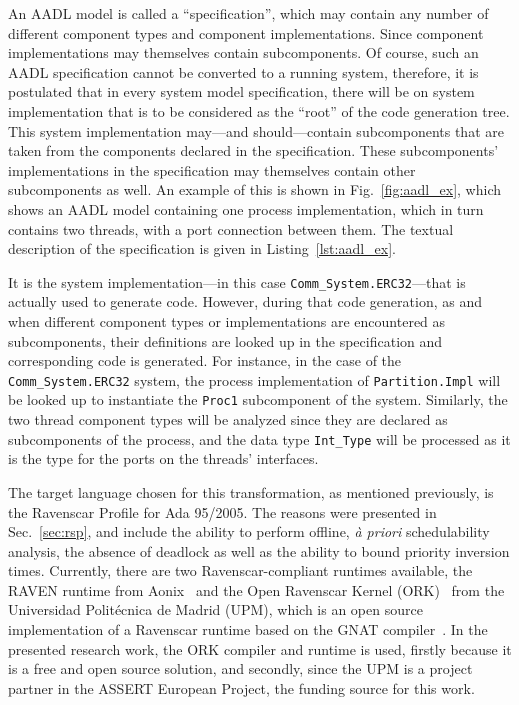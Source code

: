 An AADL model is called a ``specification'', which may contain any
number of different component types and component
implementations. Since component implementations may themselves
contain subcomponents. Of course, such an AADL specification cannot be
converted to a running system, therefore, it is postulated that in
every system model specification, there will be on system
implementation that is to be considered as the ``root'' of the code
generation tree. This system implementation may---and should---contain
subcomponents that are taken from the components declared in the
specification. These subcomponents' implementations in the
specification may themselves contain other subcomponents as well. An
example of this is shown in Fig.~\ref{fig:aadl_ex}, which shows an
AADL model containing one process implementation, which in turn
contains two threads, with a port connection between them. The textual
description of the specification is given in
Listing~\ref{lst:aadl_ex}.

It is the system implementation---in this case
\texttt{Comm\_System.ERC32}---that is actually used to generate
code. However, during that code generation, as and when different
component types or implementations are encountered as subcomponents,
their definitions are looked up in the specification and corresponding
code is generated. For instance, in the case of the
\texttt{Comm\_System.ERC32} system, the process implementation of
\texttt{Partition.Impl} will be looked up to instantiate the
\texttt{Proc1} subcomponent of the system. Similarly, the two thread
component types will be analyzed since they are declared as
subcomponents of the process, and the data type \texttt{Int\_Type}
will be processed as it is the type for the ports on the threads'
interfaces.

The target language chosen for this transformation, as mentioned
previously, is the Ravenscar Profile for Ada 95/2005. The reasons were
presented in Sec.~\ref{sec:rsp}, and include the ability to perform
offline, \emph{\`a priori} schedulability analysis, the absence of
deadlock as well as the ability to bound priority inversion
times. Currently, there are two Ravenscar-compliant runtimes
available, the RAVEN runtime from Aonix~\cite{aonix-raven} and the
Open Ravenscar Kernel (ORK)~\cite{puente@ae00} from the Universidad
Polit\'ecnica de Madrid (UPM), which is an open source implementation of a
Ravenscar runtime based on the GNAT compiler~\cite{gnu-gnat}. In the
presented research work, the ORK compiler and runtime is used, firstly
because it is a free and open source solution, and secondly, since the
UPM is a project partner in the ASSERT European Project, the funding
source for this work.

